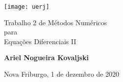 \begin{titlepage}
    \begin{center}
        \vspace*{1cm}

        \texttt{[image: uerj]}

        {\Huge
           Trabalho 2 de Métodos Numéricos \\
           para \\
           Equações Diferenciais II \par
        }

        \vspace{1.5cm}

        \textbf{Ariel Nogueira Kovaljski}

        \vspace{0.5cm}

        Nova Friburgo, 1 de dezembro de 2020
        \vfill

    \end{center}
\end{titlepage}